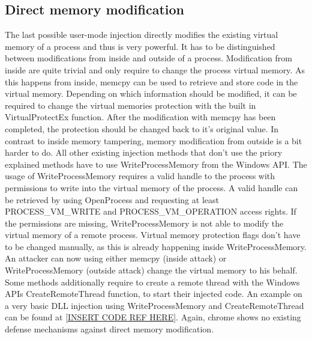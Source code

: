 \subsection{Direct memory modification}
The last possible user-mode injection directly modifies the existing virtual memory of a process and thus is very powerful. It has to be distinguished between modifications from inside and outside of a process. Modification from inside are quite trivial and only require to change the process virtual memory. As this happens from inside, memcpy can be used to retrieve and store code in the virtual memory. Depending on which information should be modified, it can be required to change the virtual memories protection with the built in VirtualProtectEx function. After the modification with memcpy has been completed, the protection should be changed back to it's original value.
In contrast to inside memory tampering, memory modification from outside is a bit harder to do. All other existing injection methods that don't use the priory explained methods have to use WriteProcessMemory from the Windows API. The usage of WriteProcessMemory requires a valid handle to the process with permissions to write into the virtual memory of the process. A valid handle can be retrieved by using OpenProcess and requesting at least PROCESS\_VM\_WRITE and PROCESS\_VM\_OPERATION access rights. If the permissions are missing, WriteProcessMemory is not able to modify the virtual memory of a remote process. Virtual memory protection flags don't have to be changed manually, as this is already happening inside WriteProcessMemory. An attacker can now using either memcpy (inside attack) or WriteProcessMemory (outside attack) change the virtual memory to his behalf. Some methods additionally require to create a remote thread with the Windows APIs CreateRemoteThread function, to start their injected code. An example on a very basic DLL injection using WriteProcessMemory and CreateRemoteThread can be found at \ref{INSERT CODE REF HERE}. Again, chrome shows no existing defense mechanisms against direct memory modification.